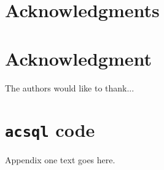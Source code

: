 \documentclass[10pt,journal,compsoc]{IEEEtran}
\begin{document}
  \section*{Acknowledgments}
\else
  \section*{Acknowledgment}
\fi
  The authors would like to thank...

\appendices
\section{\texttt{acsql} code}
Appendix one text goes here.



\ifCLASSOPTIONcaptionsoff
  \newpage
\fi
\end{document}
